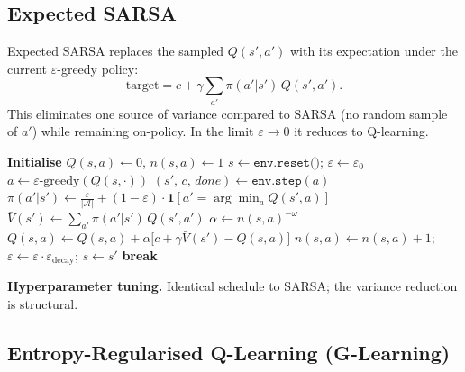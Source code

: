 \documentclass[11pt]{article}
\begin{document}
\subsection{Expected SARSA}

Expected SARSA replaces the sampled $Q(s', a')$ with its expectation under
the current $\varepsilon$-greedy policy:
\begin{equation}
    \text{target} = c + \gamma \sum_{a'} \pi(a'|s')\, Q(s',a').
\end{equation}
This eliminates one source of variance compared to SARSA (no random sample
of $a'$) while remaining on-policy.  In the limit $\varepsilon \to 0$ it
reduces to Q-learning.

\begin{algorithm}[H]
\caption{Expected SARSA}
\label{alg:esarsa}
\begin{algorithmic}[1]
\State \textbf{Initialise} $Q(s,a)\leftarrow 0$,\; $n(s,a)\leftarrow 1$
    \State $s \leftarrow \texttt{env.reset()}$;\; $\varepsilon \leftarrow \varepsilon_0$
        \State $a \leftarrow \varepsilon\text{-greedy}(Q(s,\cdot))$
        \State $(s',\, c,\, \textit{done}) \leftarrow \texttt{env.step}(a)$
        \State $\pi(a'|s') \leftarrow \tfrac{\varepsilon}{|\mathcal{A}|} + (1-\varepsilon)\cdot\mathbf{1}[a'=\arg\min_a Q(s',a)]$
        \State $\bar{V}(s') \leftarrow \sum_{a'}\pi(a'|s')\,Q(s',a')$ 
        \State $\alpha \leftarrow n(s,a)^{-\omega}$
        \State $Q(s,a) \leftarrow Q(s,a) + \alpha\bigl[c + \gamma\bar{V}(s') - Q(s,a)\bigr]$
        \State $n(s,a)\leftarrow n(s,a)+1$;\; $\varepsilon\leftarrow\varepsilon\cdot\varepsilon_{\text{decay}}$;\; $s\leftarrow s'$
         \textbf{break} \EndIf
    \EndFor
\EndFor
\end{algorithmic}
\end{algorithm}

\textbf{Hyperparameter tuning.}  Identical schedule to SARSA; the variance
reduction is structural.

\subsection{Entropy-Regularised Q-Learning (G-Learning)}
\end{document}
